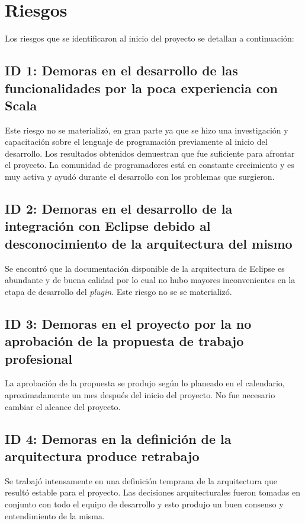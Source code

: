 \documentclass[12pt,a4paper]{article}
\let\stdsection\section
\renewcommand\section{\newpage\stdsection}
\begin{document}
\section{Riesgos}

Los riesgos que se identificaron al inicio del proyecto se detallan a continuación:

\subsection{ID 1: Demoras en el desarrollo de las funcionalidades por la poca experiencia con Scala}
Este riesgo no se materializó, en gran parte ya que se hizo una investigación y capacitación sobre el lenguaje de
programación previamente al inicio del desarrollo. Los resultados obtenidos demuestran que fue suficiente
para afrontar el proyecto. La comunidad de programadores está en constante crecimiento y es muy activa y ayudó
durante el desarrollo con los problemas que surgieron.

\subsection{ID 2: Demoras en el desarrollo de la integración con Eclipse debido al desconocimiento de la 
arquitectura del mismo}
Se encontró que la documentación disponible de la arquitectura de Eclipse es abundante y de buena calidad por
lo cual no hubo mayores inconvenientes en la etapa de desarrollo del \textit{plugin}. Este riesgo no se se
materializó.

\subsection{ID 3: Demoras en el proyecto por la no aprobación de la propuesta de trabajo profesional}
La aprobación de la propuesta se produjo según lo planeado en el calendario, aproximadamente un mes después del
inicio del proyecto. No fue necesario cambiar el alcance del proyecto.

\subsection{ID 4: Demoras en la definición de la arquitectura produce retrabajo}
Se trabajó intensamente en una definición temprana de la arquitectura que resultó estable para el proyecto. Las
decisiones arquitecturales fueron tomadas en conjunto con todo el equipo de desarrollo y esto produjo un buen
consenso y entendimiento de la misma.
\end{document}
